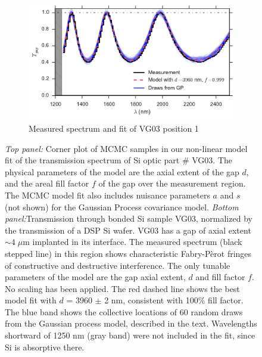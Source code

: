 \documentclass[osajnl,preprint,showpacs,superscriptaddress,12pt]{revtex4-1} %
\begin{document}
\begin{figure}[htbp]
        \begin{subfigure}[b]{0.5\textwidth}
                \includegraphics[width=\textwidth]{figs/VG03_f100.pdf}
                \caption{Measured spectrum and fit of VG03 position 1}
                \label{figVG03_f100}
        \end{subfigure}
\caption{ \emph{Top panel:} Corner plot of MCMC samples in our non-linear model fit of the transmission spectrum of Si optic part \# VG03.  The physical parameters of the model are the axial extent of the gap $d$, and the areal fill factor $f$ of the gap over the measurement region.  The MCMC model fit also includes nuisance parameters $a$ and $s$ (not shown) for the Gaussian Process covariance model.  \emph{Bottom panel:}Transmission through bonded Si sample VG03, normalized by the transmission of a DSP Si wafer. VG03 has a gap of axial extent $\sim4\;\mu$m implanted in its interface.  The measured spectrum (black stepped line) in this region shows characteristic Fabry-P\`erot fringes of constructive and destructive interference.  The only tunable parameters of the model are the gap axial extent, $d$ and fill factor $f$.  No scaling has been applied.  The red dashed line shows the best model fit with $d$ = 3960 $\pm$ 2 nm, consistent with 100\% fill factor.  The blue band shows the collective locations of 60 random draws from the Gaussian process model, described in the text.  Wavelengths shortward of 1250 nm (gray band) were not included in the fit, since Si is absorptive there.\label{figVG03full} }
\end{figure}
\end{document}
